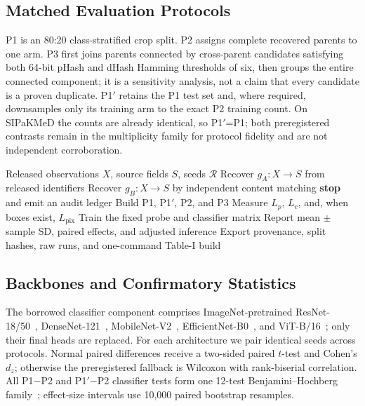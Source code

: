 \documentclass[conference]{IEEEtran}
\newcommand{\protocol}[1]{\textsf{#1}}
\begin{document}
\subsection{Matched Evaluation Protocols}
\protocol{P1} is an 80:20 class-stratified crop split.
\protocol{P2} assigns complete recovered parents to one arm.
\protocol{P3} first joins parents connected by cross-parent candidates satisfying both 64-bit pHash and dHash Hamming thresholds of six, then groups the entire connected component; it is a sensitivity analysis, not a claim that every candidate is a proven duplicate.
\protocol{P1$'$} retains the \protocol{P1} test set and, where required, downsamples only its training arm to the exact \protocol{P2} training count.
On SIPaKMeD the counts are already identical, so \protocol{P1$'$}=\protocol{P1}; both preregistered contrasts remain in the multiplicity family for protocol fidelity and are not independent corroboration.

\begin{algorithm}[t]
\caption{Fail-closed provenance-aware evaluation}
\label{alg:cytofair}
\begin{algorithmic}[1]
\Require Released observations $X$, source fields $S$, seeds $\mathcal{R}$
\State Recover $g_A:X\!\to\!S$ from released identifiers
\State Recover $g_B:X\!\to\!S$ by independent content matching
    \State \textbf{stop} and emit an audit ledger
\EndIf
{}
    \State Build \protocol{P1}, \protocol{P1$'$}, \protocol{P2}, and \protocol{P3}
    \State Measure $L_p$, $L_c$, and, when boxes exist, $L_{\mathrm{pix}}$
    \State Train the fixed probe and classifier matrix
\EndFor
\State Report mean $\pm$ sample SD, paired effects, and adjusted inference
\State Export provenance, split hashes, raw runs, and one-command Table-I build
\end{algorithmic}
\end{algorithm}

\subsection{Backbones and Confirmatory Statistics}
The borrowed classifier component comprises ImageNet-pretrained ResNet-18/50~\cite{he2016resnet}, DenseNet-121~\cite{huang2017densenet}, MobileNet-V2~\cite{sandler2018mobilenetv2}, EfficientNet-B0~\cite{tan2019efficientnet}, and ViT-B/16~\cite{dosovitskiy2021vit}; only their final heads are replaced.
For each architecture we pair identical seeds across protocols.
Normal paired differences receive a two-sided paired $t$-test and Cohen's $d_z$; otherwise the preregistered fallback is Wilcoxon with rank-biserial correlation.
All \protocol{P1}$-$\protocol{P2} and \protocol{P1$'$}$-$\protocol{P2} classifier tests form one 12-test Benjamini--Hochberg family~\cite{benjamini1995fdr}; effect-size intervals use 10,000 paired bootstrap resamples.
\end{document}
